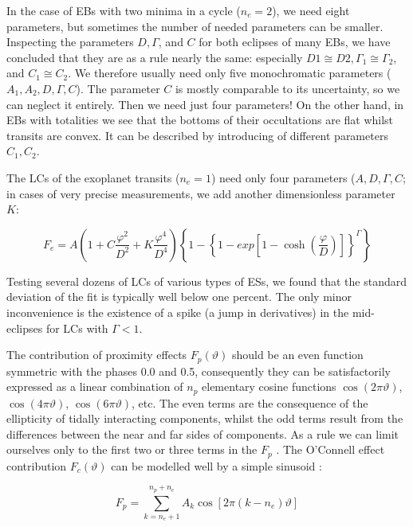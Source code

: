 In the case of EBs with two minima in a cycle ($n_{e} = 2$), we
need eight parameters, but sometimes the number of needed parameters
can be smaller. Inspecting the parameters $D, \Gamma$, and
$C$ for both eclipses of many EBs, we have concluded that they
are as a rule nearly the same: especially $D1 \cong D2, \Gamma_{1} \cong \Gamma_{2}$, and
$C_{1} \cong C_{2}$. We therefore usually need only five monochromatic parameters
($A_{1}, A_{2}, D, \Gamma,C$). The parameter $C$ is mostly comparable
to its uncertainty, so we can neglect it entirely. Then we need
just four parameters! On the other hand, in EBs with totalities
we see that the bottoms of their occultations are flat whilst transits
are convex. It can be described by introducing of different
parameters $C_{1},C_{2}$.

The LCs of the exoplanet transits ($n_{e} = 1$) need only
four parameters ($A, D, \Gamma,C$; in cases of very precise
measurements, we add another dimensionless parameter $K$:

\begin{equation}\label{eq:mik_3}
F_{e} = A\left( 1+C \frac{\varphi^2}{D^2}+K\frac{\varphi^4}{D^4}\right) 
\left\lbrace 1- \left\lbrace 1-exp\left[ 1-\cosh \left( \frac{\varphi}{D}\right) \right] \right\rbrace ^{\Gamma} \right\rbrace  
\end{equation}

Testing several dozens of LCs of various types of ESs, we found
that the standard deviation of the fit is typically well below one percent. 
The only minor inconvenience is the existence of a spike (a jump in derivatives) in 
the mid-eclipses for LCs with $\Gamma < 1$.

The contribution of proximity effects $F_{p}(\vartheta)$ should be an
even function symmetric with the phases 0.0 and 0.5, consequently
they can be satisfactorily expressed as a linear combination of $n_{p}$ elementary cosine functions $\cos(2\pi \vartheta)$,
$\cos(4\pi \vartheta)$, $\cos(6\pi \vartheta)$, etc. The even terms are the consequence
of the ellipticity of tidally interacting components, whilst the odd
terms result from the differences between the near and far sides
of components. As a rule we can limit ourselves only to the first
two or three terms in the $F_{p}$ \parencite{russell1952,kallrath1999}. 
The O’Connell effect contribution $F_{c}(\vartheta)$ can be modelled well by a simple sinusoid \parencite{davidge1984, wilsey2009}:

\begin{equation}\label{eq:mik_Fp}
F_{p}  = \sum_{k=n_{e}+1}^{n_{p}+n_{e}} A_{k}\cos \left[ 2\pi(k-n_{e})\vartheta\right]
\end{equation}

